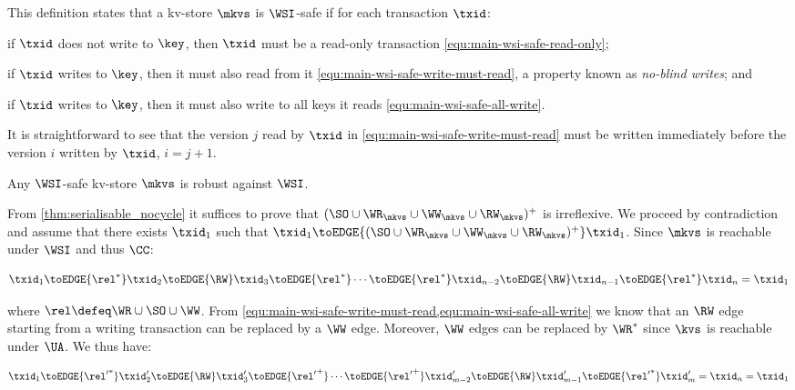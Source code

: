 This definition states that a kv-store $\mkvs$ is \(\WSI\)-safe if for each transaction $\txid$: 
\begin{enumerate*} 
    \item if $\txid$ does not write to $\key$, then $\txid$ must be a read-only transaction \eqref{equ:main-wsi-safe-read-only}; 
    \item if \( \txid \) writes to $\key$, then it must also read from it \eqref{equ:main-wsi-safe-write-must-read}, a property known as \emph{no-blind writes}; and
	\item if \( \txid \) writes to $\key$, then it must also write to all keys it reads \eqref{equ:main-wsi-safe-all-write}.
\end{enumerate*}
It is straightforward to see that the version $j$ read by \( \txid \) in \eqref{equ:main-wsi-safe-write-must-read} must be written immediately before the version $i$ written by \( \txid \), \ie \( i {=} j + 1 \).

\spaceshrink{-5pt}
\begin{theorem}
 \label{thm:main-wsi-robust}
    Any \(\WSI\)-safe kv-store \( \mkvs \) is robust against \(\WSI\).   
\end{theorem}
\spaceshrink{-5pt}

\noindent From \cref{thm:serialisable_nocycle} it suffices to prove that $(\SO \cup \WR_{\mkvs} \cup \WW_{\mkvs} \cup \RW_{\mkvs})^{+}$ is irreflexive.
We proceed by contradiction and assume that there exists $\txid_1$ such that $\txid_1 \toEDGE{(\SO \cup \WR_{\mkvs} \cup \WW_{\mkvs} \cup \RW_{\mkvs})^{+}} \txid_1$. 
Since \( \mkvs \) is reachable under \( \WSI \) and thus \( \CC \):%

\spaceshrink{-5pt}
{\displaymathfont
\[
    \txid_1 \toEDGE{\rel^*} \txid_2 \toEDGE{\RW} \txid_3 \toEDGE{\rel^*} \cdots \toEDGE{\rel^*} \txid_{n-2} \toEDGE{\RW} \txid_{n-1} \toEDGE{\rel^*} \txid_n = \txid_1
\]
\normalsize}%
\spaceshrink{-10pt}
 
\noindent{}where \( \rel \defeq \WR \cup \SO \cup \WW \).
From \cref{equ:main-wsi-safe-write-must-read,equ:main-wsi-safe-all-write} we know that 
an \( \RW \) edge starting from a writing transaction can be replaced by a \( \WW \) edge.
Moreover, \( \WW \) edges can be replaced by \( \WR^* \) since \( \kvs \) is reachable under \( \UA \).
We thus have:

\spaceshrink{-5pt}
{\displaymathfont
\[
    \txid_1 \toEDGE{{\rel'}^*} \txid'_2 \toEDGE{\RW} \txid'_3 \toEDGE{{\rel'}^+} \cdots \toEDGE{{\rel'}^+} \txid'_{m-2} \toEDGE{\RW} \txid'_{m-1} \toEDGE{{\rel'}^*} \txid'_m = \txid_n = \txid_1
\]
\normalsize}
\spaceshrink{-10pt}

